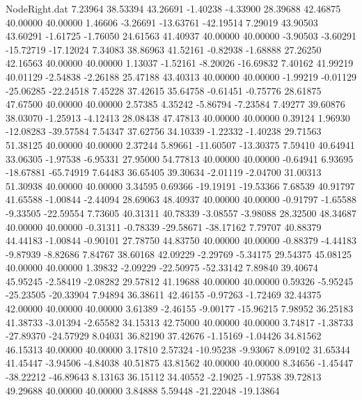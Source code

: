 \begin{filecontents}{NodeRight.dat}
   7.23964   38.53394   43.26691    -1.40238   -4.33900   28.39688   42.46875   40.00000   40.00000    1.46606   -3.26691  -13.63761  -42.19514
   7.29019   43.90503   43.60291    -1.61725   -1.76050   24.61563   41.40937   40.00000   40.00000   -3.90503   -3.60291  -15.72719  -17.12024
   7.34083   38.86963   41.52161    -0.82938   -1.68888   27.26250   42.16563   40.00000   40.00000    1.13037   -1.52161   -8.20026  -16.69832
   7.40162   41.99219   40.01129    -2.54838   -2.26188   25.47188   43.40313   40.00000   40.00000   -1.99219   -0.01129  -25.06285  -22.24518
   7.45228   37.42615   35.64758    -0.61451   -0.75776   28.61875   47.67500   40.00000   40.00000    2.57385    4.35242   -5.86794   -7.23584
   7.49277   39.60876   38.03070    -1.25913   -4.12413   28.08438   47.47813   40.00000   40.00000    0.39124    1.96930  -12.08283  -39.57584
   7.54347   37.62756   34.10339    -1.22332   -1.40238   29.71563   51.38125   40.00000   40.00000    2.37244    5.89661  -11.60507  -13.30375
   7.59410   40.64941   33.06305    -1.97538   -6.95331   27.95000   54.77813   40.00000   40.00000   -0.64941    6.93695  -18.67881  -65.74919
   7.64483   36.65405   39.30634    -2.01119   -2.04700   31.00313   51.30938   40.00000   40.00000    3.34595    0.69366  -19.19191  -19.53366
   7.68539   40.91797   41.65588    -1.00844   -2.44094   28.69063   48.40937   40.00000   40.00000   -0.91797   -1.65588   -9.33505  -22.59554
   7.73605   40.31311   40.78339    -3.08557   -3.98088   28.32500   48.34687   40.00000   40.00000   -0.31311   -0.78339  -29.58671  -38.17162
   7.79707   40.88379   44.44183    -1.00844   -0.90101   27.78750   44.83750   40.00000   40.00000   -0.88379   -4.44183   -9.87939   -8.82686
   7.84767   38.60168   42.09229    -2.29769   -5.34175   29.54375   45.08125   40.00000   40.00000    1.39832   -2.09229  -22.50975  -52.33142
   7.89840   39.40674   45.95245    -2.58419   -2.08282   29.57812   41.19688   40.00000   40.00000    0.59326   -5.95245  -25.23505  -20.33904
   7.94894   36.38611   42.46155    -0.97263   -1.72469   32.44375   42.00000   40.00000   40.00000    3.61389   -2.46155   -9.00177  -15.96215
   7.98952   36.25183   41.38733    -3.01394   -2.65582   34.15313   42.75000   40.00000   40.00000    3.74817   -1.38733  -27.89370  -24.57929
   8.04031   36.82190   37.42676    -1.15169   -1.04426   34.81562   46.15313   40.00000   40.00000    3.17810    2.57324  -10.95238   -9.93067
   8.09102   31.65344   41.45447    -3.94506   -4.84038   40.51875   43.81562   40.00000   40.00000    8.34656   -1.45447  -38.22212  -46.89643
   8.13163   36.15112   34.40552    -2.19025   -1.97538   39.72813   49.29688   40.00000   40.00000    3.84888    5.59448  -21.22048  -19.13864

\end{filecontents}
